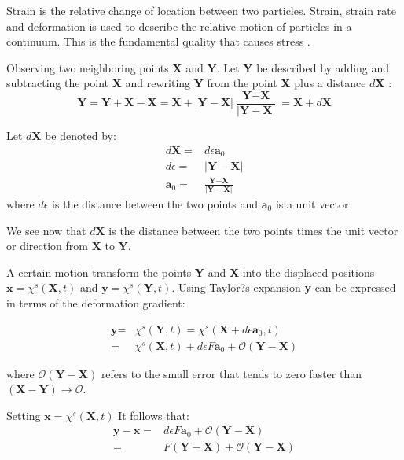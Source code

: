 Strain is the relative change of location between two particles. Strain, strain rate and deformation is used to describe the relative motion of particles in a continuum. This is the fundamental quality that causes stress \cite{Richter2016}.

Observing two neighboring points \textbf{X} and \textbf{Y}. Let \textbf{Y} be described by adding and subtracting the point \textbf{X} and rewriting \textbf{Y} from the point \textbf{X} plus a distance $d\textbf{X}$   :
\begin{equation}
\textbf{Y} = \textbf{Y} + \textbf{X} - \textbf{X} = \textbf{X} + |\textbf{Y} - \textbf{X}| \frac{\textbf{Y} - \textbf{X}}{|\textbf{Y} - \textbf{X}|} = \textbf{X} + d\textbf{X}
\end{equation}

Let $d\textbf{X}$ be denoted by:
\begin{align}
d\textbf{X} =& d\epsilon \textbf{a}_0\\
d\epsilon =& |\textbf{Y} - \textbf{X}| \\
\textbf{a}_0 =& \frac{\textbf{Y} - \textbf{X}}{|\textbf{Y} - \textbf{X}|}
\end{align}
where $d\epsilon$ is the distance between the two points and $\textbf{a}_0$ is a unit vector 

We see now that $d\textbf{X}$ is the distance between the two points times the unit vector or direction from $\textbf{X}$ to $\textbf{Y}$.
\newline

A certain motion transform the points $\textbf{Y}$ and $\textbf{X}$ into the displaced positions $\textbf{x} = \chi^s(\textbf{X},t)$ and $\textbf{y} = \chi^s(\textbf{Y},t)$. Using Taylor?s expansion \textbf{y} can be expressed in terms of the deformation gradient:

\begin{align}
\textbf{y} =& \chi^s(\textbf{Y},t) = \chi^s(\textbf{X} + d\epsilon \textbf{a}_0,t) \\
=& \chi^s(\textbf{X},t) + d\epsilon F \textbf{a}_0 + \mathcal{O}(\textbf{Y}-\textbf{X}) 
\end{align}

where $\mathcal{O} (\textbf{Y}-\textbf{X})$ refers to the small error that tends to zero faster than $(\textbf{X} - \textbf{Y}) \rightarrow \mathcal{O}$. \newline

Setting $\textbf{x} = \chi^s(\textbf{X},t)$  It follows that:
\begin{align}
\textbf{y} - \textbf{x} =&  d\epsilon F \textbf{a}_0 + \mathcal{O}(\textbf{Y}-\textbf{X}) \\
=& F(\textbf{Y} - \textbf{X}) + \mathcal{O}(\textbf{Y}-\textbf{X}) 
\end{align}

